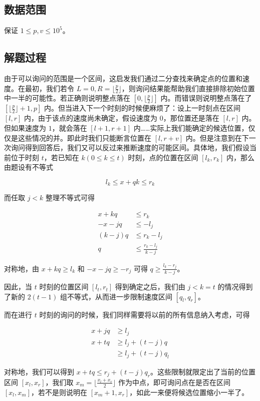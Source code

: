 \documentclass[12pt]{ctexart}
\begin{document}
\subsection{数据范围}

保证 $1\le p,v\le 10^5$。

\subsection{解题过程}

由于可以询问的范围是一个区间，这启发我们通过二分查找来确定点的位置和速度。在最初，我们若令 $L=0, R=\lfloor \frac p 2 \rfloor$，则询问结果能帮助我们直接排除初始位置中一半的可能性。若正确则说明整点落在 $[0, \lfloor \frac p 2 \rfloor]$ 内。而错误则说明整点落在了 $[\lfloor \frac p 2\rfloor + 1, p]$ 内。但当进入下一个时刻的时候便麻烦了：设上一时刻点在区间 $[l, r]$ 内，由于该点的速度尚未确定，假设速度为 $0$，那位置还是落在 $[l, r]$ 内。但如果速度为 $1$，就会落在 $[l+1,r+1]$ 内……实际上我们能确定的候选位置，仅仅是这些情况的并。即此时我们只能断言位置在 $[l, r+v]$ 内。但是注意到在下一次询问得到回答后，我们又可以反过来推断速度的可能区间。具体地，我们假设当前位于时刻 $t$，若已知在 $k(0\le k\le t)$ 时刻，点的位置在区间 $[l_k, r_k]$ 内，那么由题设有不等式

$$
l_k \le x + qk\le r_k
$$

而任取 $j<k$ 整理不等式可得

\begin{align}
x+kq & \le r_k \nonumber  \\
-x-jq & \le -l_j \nonumber \\
(k-j) q & \le r_k - l_j \nonumber \\
q & \le \frac {r_k - l_j}{k-j} \label{boundq}
\end{align}

对称地，由 $x+kq\ge l_k$ 和 $-x-jq \ge -r_j$ 可得 $q\ge  \frac{l_k -r_j}{k-j}$。

因此，当 $t$ 时刻的位置区间 $[l_t, r_t]$ 得到确定之后，我们由 $j<k=t$ 的情况得到了新的 $2(t-1)$ 组不等式，从而进一步限制速度区间 $[q_l, q_r]$。

而在进行 $t$ 时刻的询问的时候，我们同样需要将以前的所有信息纳入考虑，可得

\begin{align*}
x + jq & \ge l_j\\
x + tq & \ge l_j + (t-j)q\\
 & \ge l_j + (t-j)q_l
\end{align*}

对称地，我们可以得到 $x + tq \le r_j + (t-j)q_r$。这些限制就限定出了当前的位置区间 $[x_l,x_r]$，我们取 $x_m=\lfloor \frac {x_l+x_r}2\rfloor$ 作为中点，即可询问点在是否在区间 $[x_l, x_m]$，若不是则说明在 $[x_m+1,x_r]$，如此一来便将候选位置缩小一半了。
\end{document}
